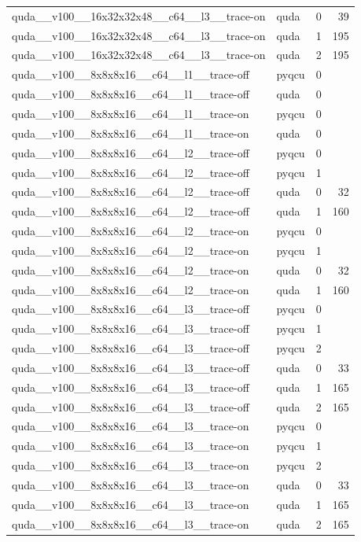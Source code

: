 \begin{table}[htbp]
\begin{tabular}{@{}llrr@{}}
quda\_\_v100\_\_16x32x32x48\_\_c64\_\_l3\_\_trace-on & quda & 0 & 39 \\
quda\_\_v100\_\_16x32x32x48\_\_c64\_\_l3\_\_trace-on & quda & 1 & 195 \\
quda\_\_v100\_\_16x32x32x48\_\_c64\_\_l3\_\_trace-on & quda & 2 & 195 \\
quda\_\_v100\_\_8x8x8x16\_\_c64\_\_l1\_\_trace-off & pyqcu & 0 &  \\
quda\_\_v100\_\_8x8x8x16\_\_c64\_\_l1\_\_trace-off & quda & 0 &  \\
quda\_\_v100\_\_8x8x8x16\_\_c64\_\_l1\_\_trace-on & pyqcu & 0 &  \\
quda\_\_v100\_\_8x8x8x16\_\_c64\_\_l1\_\_trace-on & quda & 0 &  \\
quda\_\_v100\_\_8x8x8x16\_\_c64\_\_l2\_\_trace-off & pyqcu & 0 &  \\
quda\_\_v100\_\_8x8x8x16\_\_c64\_\_l2\_\_trace-off & pyqcu & 1 &  \\
quda\_\_v100\_\_8x8x8x16\_\_c64\_\_l2\_\_trace-off & quda & 0 & 32 \\
quda\_\_v100\_\_8x8x8x16\_\_c64\_\_l2\_\_trace-off & quda & 1 & 160 \\
quda\_\_v100\_\_8x8x8x16\_\_c64\_\_l2\_\_trace-on & pyqcu & 0 &  \\
quda\_\_v100\_\_8x8x8x16\_\_c64\_\_l2\_\_trace-on & pyqcu & 1 &  \\
quda\_\_v100\_\_8x8x8x16\_\_c64\_\_l2\_\_trace-on & quda & 0 & 32 \\
quda\_\_v100\_\_8x8x8x16\_\_c64\_\_l2\_\_trace-on & quda & 1 & 160 \\
quda\_\_v100\_\_8x8x8x16\_\_c64\_\_l3\_\_trace-off & pyqcu & 0 &  \\
quda\_\_v100\_\_8x8x8x16\_\_c64\_\_l3\_\_trace-off & pyqcu & 1 &  \\
quda\_\_v100\_\_8x8x8x16\_\_c64\_\_l3\_\_trace-off & pyqcu & 2 &  \\
quda\_\_v100\_\_8x8x8x16\_\_c64\_\_l3\_\_trace-off & quda & 0 & 33 \\
quda\_\_v100\_\_8x8x8x16\_\_c64\_\_l3\_\_trace-off & quda & 1 & 165 \\
quda\_\_v100\_\_8x8x8x16\_\_c64\_\_l3\_\_trace-off & quda & 2 & 165 \\
quda\_\_v100\_\_8x8x8x16\_\_c64\_\_l3\_\_trace-on & pyqcu & 0 &  \\
quda\_\_v100\_\_8x8x8x16\_\_c64\_\_l3\_\_trace-on & pyqcu & 1 &  \\
quda\_\_v100\_\_8x8x8x16\_\_c64\_\_l3\_\_trace-on & pyqcu & 2 &  \\
quda\_\_v100\_\_8x8x8x16\_\_c64\_\_l3\_\_trace-on & quda & 0 & 33 \\
quda\_\_v100\_\_8x8x8x16\_\_c64\_\_l3\_\_trace-on & quda & 1 & 165 \\
quda\_\_v100\_\_8x8x8x16\_\_c64\_\_l3\_\_trace-on & quda & 2 & 165 \\
\bottomrule
\end{tabular}
\end{table}

